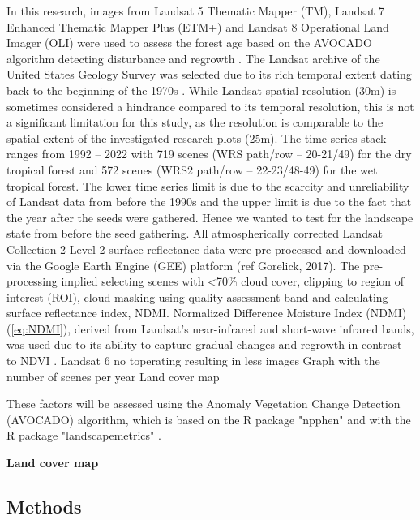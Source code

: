In this research, images from Landsat 5 Thematic Mapper (TM), Landsat 7 Enhanced Thematic Mapper Plus (ETM+) and Landsat 8 Operational Land Imager (OLI) were used to assess the forest age based on the AVOCADO algorithm detecting disturbance and regrowth \citep{decuyperContinuousMonitoringForest2022}. The Landsat archive of the United States Geology Survey was selected due to its rich temporal extent dating back to the beginning of the 1970s \citep{kennedyBringingEcologicalView2014, finerCombatingDeforestationSatellite2018}. While Landsat spatial resolution (30m) is sometimes considered a hindrance compared to its temporal resolution, this is not a significant limitation for this study, as the resolution is comparable to the spatial extent of the investigated research plots (25m).
The time series stack ranges from 1992 – 2022 with 719 scenes (WRS path/row – 20-21/49)  for the dry tropical forest and 572 scenes (WRS2 path/row – 22-23/48-49) for the wet tropical forest. The lower time series limit is due to the scarcity and unreliability of Landsat data from before the 1990s and the upper limit is due to the fact that the year after the seeds were gathered. Hence we wanted to test for the landscape state from before the seed gathering. 
All atmospherically corrected Landsat Collection 2 Level 2 surface reflectance data were pre-processed and downloaded via the Google Earth Engine (GEE) platform (ref Gorelick, 2017). The pre-processing implied selecting scenes with <70\% cloud cover, clipping to region of interest (ROI), cloud masking using quality assessment band and calculating surface reflectance index, NDMI. Normalized Difference Moisture Index (NDMI) (\ref{eq:NDMI}), derived from Landsat's near-infrared and short-wave infrared bands, was used due to its ability to capture gradual changes and regrowth in contrast to NDVI \citep{vermotePreliminaryAnalysisPerformance2016}. 
Landsat 6 no toperating resulting in less images
Graph with the number of scenes per year
Land cover map



These factors will be assessed using the Anomaly Vegetation Change Detection (AVOCADO) algorithm, which is based on the R package "npphen" and with the R package "landscapemetrics" \citep{decuyperContinuousMonitoringForest2022, chavez2017npphen, hesselbarth2019landscapemetrics}. 

\textbf{Land cover map}\\



\subsection{Methods}
